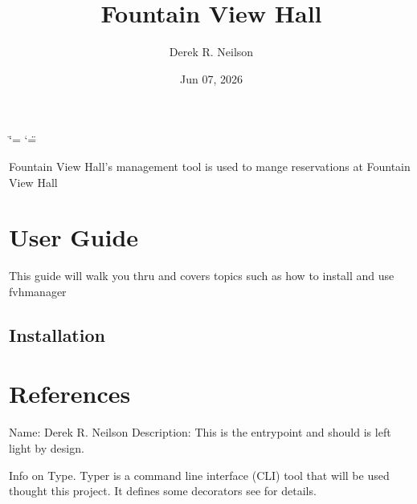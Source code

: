 \documentclass[letterpaper,10pt,english]{sphinxmanual}
\title{Fountain View Hall}
\date{Jun 07, 2026}
\author{Derek R.\@{} Neilson}
\begin{document}
\ifdefined\shorthandoff
  \ifnum\catcode`\=\string=\active\shorthandoff{=}\fi
  \ifnum\catcode`\"=\active{}\fi
\fi

\pagestyle{empty}
\sphinxmaketitle
\pagestyle{plain}
\sphinxtableofcontents
\pagestyle{normal}
\label{\detokenize{index::doc}}


\sphinxAtStartPar
Fountain View Hall’s management tool  is used to mange reservations at Fountain View Hall

\sphinxstepscope


\chapter{User Guide}
\label{\detokenize{user-guide:user-guide}}\label{\detokenize{user-guide::doc}}
\sphinxAtStartPar
This guide will walk you thru  and covers topics such as how to install and use fvh\sphinxhyphen{}manager


\section{Installation}
\label{\detokenize{user-guide:installation}}
\sphinxstepscope


\chapter{References}
\label{\detokenize{references:module-src.main}}\label{\detokenize{references:references}}\label{\detokenize{references::doc}}
\sphinxAtStartPar
Name: Derek R. Neilson
Description: This is the entrypoint and should is left light by design.

\sphinxAtStartPar
Info on Type.
Typer is a command line interface (CLI) tool that will be used thought this project.
It defines some decorators  see  for details.

\begin{fulllineitems}
\label{\detokenize{references:src.main.main}}
\pysigstartsignatures
\pysiglinewithargsret
{}
{}
{}
\pysigstopsignatures\begin{quote}\begin{description}
\sphinxAtStartPar
{}

\end{description}\end{quote}

\end{fulllineitems}
\end{document}
